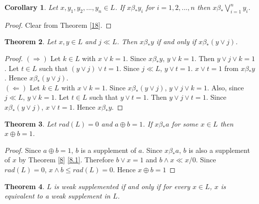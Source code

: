 \documentclass[a4paper,12pt]{article}
\newtheorem{theorem}{Theorem}[section]
\newtheorem{corollary}[theorem]{Corollary}
\numberwithin{equation}{section}
\begin{document}
\begin{corollary}\label{19}
  Let $ x, y_1, y_2,...,y_n \in L $. If $ x \beta_* y_i $ for $ i=1,2,...,n $ then $ \displaystyle x \beta_* \bigvee_{i=1}^n y_i $.
\end{corollary}
\begin{proof}
  Clear from Theorem \ref{18}.
\end{proof}

\begin{theorem}\label{20}
  Let $ x,y \in L $ and $ j \ll L $. Then $ x \beta_* y $ if and only if $ x \beta_* ( y \vee j ) $.
\end{theorem}

\begin{proof}
  $ ( \Rightarrow ) $ 
  Let $ k \in L $ with $ x \vee k = 1 $. Since $ x \beta_* y $, $ y \vee k = 1 $. Then $ y \vee j \vee k = 1 $. 
  Let $ t \in L $ such that $ ( y \vee j ) \vee t = 1 $. Since $ j \ll L $, $ y \vee t = 1 $. $ x \vee t = 1 $ from $ x \beta_* y $. 
  Hence $ x \beta_* ( y \vee j ) $. \\
  $( \Leftarrow ) $ 
  Let $ k \in L $ with $ x \vee k = 1 $. Since $ x \beta_* ( y \vee j ) $, $ y \vee j \vee k = 1 $. Also, since $ j \ll L $, $ y \vee k = 1 $. 
  Let $ t \in L $ such that $ y \vee t = 1 $. Then $ y \vee j \vee t = 1 $. Since $ x \beta_* ( y \vee j ) $, $ x \vee t = 1 $. Hence $ x \beta_* y $.

\end{proof}

\begin{theorem}\label{21}
  Let $ rad(L)=0 $ and $ a \oplus b = 1 $. If $ x \beta_* a $ for some $ x \in L $ then $ x \oplus b = 1 $. 
\end{theorem}
\begin{proof}
  Since $ a \oplus b = 1 $, $ b $ is a supplement of $ a $. 
  Since $ x \beta_* a $, $ b $ is also a supplement of $ x $ by Theorem \ref{8} \ref{8.1}. 
  Therefore $ b \vee x = 1 $ and 
  $ b \wedge x \ll x/0 $. Since $ rad(L)=0 $, $ x \wedge b \leq rad(L) = 0 $. Hence $ x \oplus b = 1 $
\end{proof}

\begin{theorem}
  $ L $ is weak supplemented if and only if for every $ x \in L $, $ x $ is equivalent to a weak supplement in $ L $.
\end{theorem}
\end{document}

